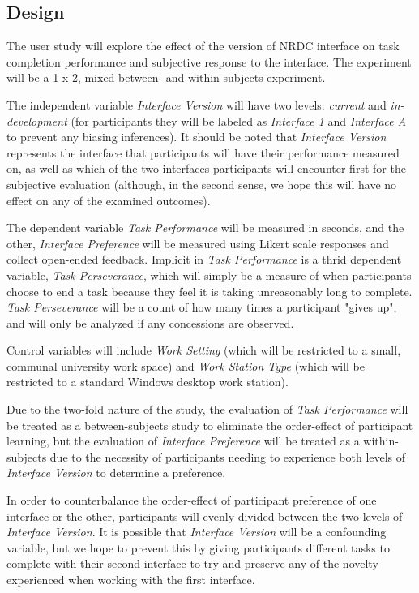 \documentclass{article}
\begin{document}
%
\subsection{Design}
The user study will explore the effect of the version of NRDC interface on task completion performance and subjective response to the interface. The experiment will be a 1 x 2, mixed between- and within-subjects experiment.

The independent variable \emph{Interface Version} will have two levels: \emph{current} and \emph{in-development} (for participants they will be labeled as \emph{Interface 1} and \emph{Interface A} to prevent any biasing inferences). It should be noted that \emph{Interface Version} represents the interface that participants will have their performance measured on, as well as which of the two interfaces participants will encounter first for the subjective evaluation (although, in the second sense, we hope this will have no effect on any of the examined outcomes).

The dependent variable \emph{Task Performance} will be measured in seconds, and the other, \emph{Interface Preference} will be measured using Likert scale responses and collect open-ended feedback. Implicit in \emph{Task Performance} is a thrid dependent variable, \emph{Task Perseverance}, which will simply be a measure of when participants choose to end a task because they feel it is taking unreasonably long to complete. \emph{Task Perseverance} will be a count of how many times a participant "gives up", and will only be analyzed if any concessions are observed.

Control variables will include \emph{Work Setting} (which will be restricted to a small, communal university work space) and \emph{Work Station Type} (which will be restricted to a standard Windows desktop work station).

Due to the two-fold nature of the study, the evaluation of \emph{Task Performance} will be treated as a between-subjects study to eliminate the order-effect of participant learning, but the evaluation of \emph{Interface Preference} will be treated as a within-subjects due to the necessity of participants needing to experience both levels of \emph{Interface Version} to determine a preference.

In order to counterbalance the order-effect of participant preference of one interface or the other, participants will evenly divided between the two levels of \emph{Interface Version}. It is possible that \emph{Interface Version} will be a confounding variable, but we hope to prevent this by giving participants different tasks to complete with their second interface to try and preserve any of the novelty experienced when working with the first interface.
\end{document}
